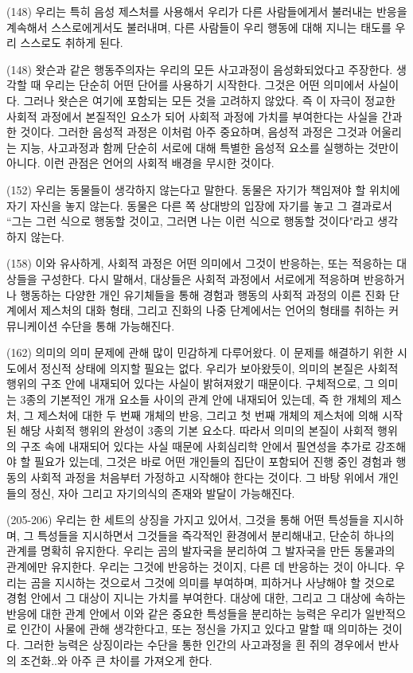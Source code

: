 \documentclass[12pt, a4paper]{article}
\begin{document}
(148) 우리는 특히 음성 제스처를 사용해서 우리가 다른 사람들에게서 불러내는 반응을 계속해서 스스로에게서도 불러내며, 다른 사람들이 우리 행동에 대해 지니는 태도를 우리 스스로도 취하게 된다.

(148) 왓슨과 같은 행동주의자는 우리의 모든 사고과정이 음성화되었다고 주장한다. 생각할 때 우리는 단순히 어떤 단어를 사용하기 시작한다. 그것은 어떤 의미에서 사실이다. 그러나 왓슨은 여기에 포함되는 모든 것을 고려하지 않았다. 즉 이 자극이 정교한 사회적 과정에서 본질적인 요소가 되어 사회적 과정에 가치를 부여한다는 사실을 간과한 것이다. 그러한 음성적 과정은 이처럼 아주 중요하며, 음성적 과정은 그것과 어울리는 지능, 사고과정과 함께 단순히 서로에 대해 특별한 음성적 요소를 실행하는 것만이 아니다. 이런 관점은 언어의 사회적 배경을 무시한 것이다.

(152) 우리는 동물들이 생각하지 않는다고 말한다. 동물은 자기가 책임져야 할 위치에 자기 자신을 놓지 않는다. 동물은 다른 쪽 상대방의 입장에 자기를 놓고 그 결과로서 ``그는 그런 식으로 행동할 것이고, 그러면 나는 이런 식으로 행동할 것이다"라고 생각하지 않는다. 

(158) 이와 유사하게, 사회적 과정은 어떤 의미에서 그것이 반응하는, 또는 적응하는 대상들을 구성한다. 다시 말해서, 대상들은 사회적 과정에서 서로에게 적응하며 반응하거나 행동하는 다양한 개인 유기체들을 통해 경험과 행동의 사회적 과정의 이른 진화 단계에서 제스처의 대화 형태, 그리고 진화의 나중 단계에서는 언어의 형태를 취하는 커뮤니케이션 수단을 통해 가능해진다. 

(162) 의미의 의미 문제에 관해 많이 민감하게 다루어왔다. 이 문제를 해결하기 위한 시도에서 정신적 상태에 의지할 필요는 없다. 우리가 보아왔듯이, 의미의 본질은 사회적 행위의 구조 안에 내재되어 있다는 사실이 밝혀져왔기 때문이다. 구체적으로, 그 의미는 3종의 기본적인 개개 요소들 사이의 관계 안에 내재되어 있는데, 즉 한 개체의 제스처, 그 제스처에 대한 두 번째 개체의 반응, 그리고 첫 번째 개체의 제스처에 의해 시작된 해당 사회적 행위의 완성이 3종의 기본 요소다. 따라서 의미의 본질이 사회적 행위의 구조 속에 내재되어 있다는 사실 때문에 사회심리학 안에서 필연성을 추가로 강조해야 할 필요가 있는데, 그것은 바로 어떤 개인들의 집단이 포함되어 진행 중인 경험과 행동의 사회적 과정을 처음부터 가정하고 시작해야 한다는 것이다. 그 바탕 위에서 개인들의 정신, 자아 그리고 자기의식의 존재와 발달이 가능해진다.

(205-206) 우리는 한 세트의 상징을 가지고 있어서, 그것을 통해 어떤 특성들을 지시하며, 그 특성들을 지시하면서 그것들을 즉각적인 환경에서 분리해내고, 단순히 하나의 관계를 명확히 유지한다. 우리는 곰의 발자국을 분리하여 그 발자국을 만든 동물과의 관계에만 유지한다. 우리는 그것에 반응하는 것이지, 다른 데 반응하는 것이 아니다. 우리는 곰을 지시하는 것으로서 그것에 의미를 부여하며, 피하거나 사냥해야 할 것으로 경험 안에서 그 대상이 지니는 가치를 부여한다. 대상에 대한, 그리고 그 대상에 속하는 반응에 대한 관계 안에서 이와 같은 중요한 특성들을 분리하는 능력은 우리가 일반적으로 인간이 사물에 관해 생각한다고, 또는 정신을 가지고 있다고 말할 때 의미하는 것이다. 그러한 능력은 상징이라는 수단을 통한 인간의 사고과정을 흰 쥐의 경우에서 반사의 조건화..와 아주 큰 차이를 가져오게 한다.
\end{document}
